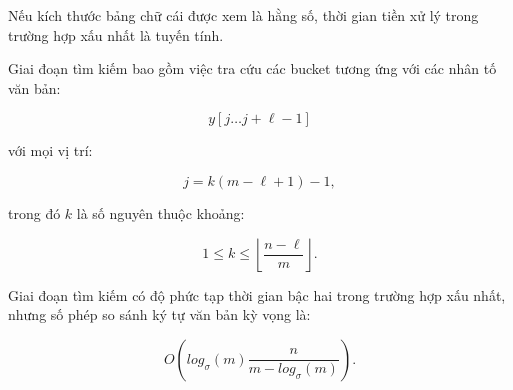 Nếu kích thước bảng chữ cái được xem là hằng số, thời gian tiền xử lý trong trường hợp xấu nhất là tuyến tính.

Giai đoạn tìm kiếm bao gồm việc tra cứu các bucket tương ứng với các nhân tố văn bản:

\[
y[j \ldots j + \ell - 1]
\]

với mọi vị trí:

\[
j = k(m - \ell + 1) - 1,
\]

trong đó $k$ là số nguyên thuộc khoảng:

\[
1 \leq k \leq \left\lfloor \frac{n-\ell}{m} \right\rfloor.
\]

Giai đoạn tìm kiếm có độ phức tạp thời gian bậc hai trong trường hợp xấu nhất, nhưng số phép so sánh ký tự văn bản kỳ vọng là:

\[
O(log_{\sigma}(m) \frac{n}{m - log_{\sigma}(m)}).
\]


